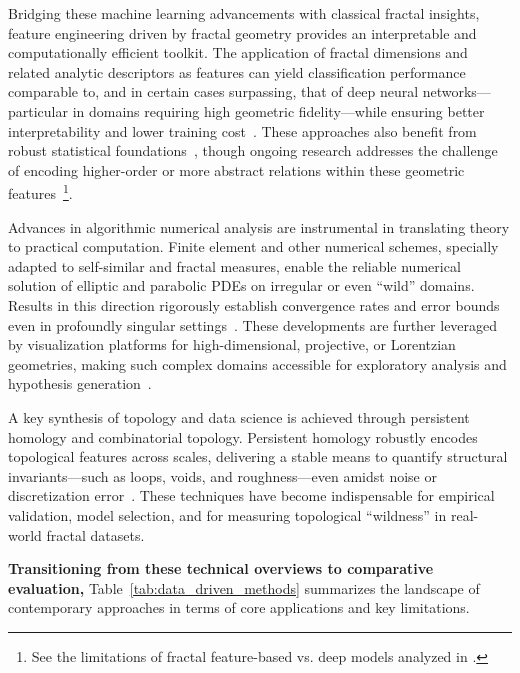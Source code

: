 \documentclass[sigconf]{acmart}
\begin{document}
Bridging these machine learning advancements with classical fractal insights, feature engineering driven by fractal geometry provides an interpretable and computationally efficient toolkit. The application of fractal dimensions and related analytic descriptors as features can yield classification performance comparable to, and in certain cases surpassing, that of deep neural networks—particular in domains requiring high geometric fidelity—while ensuring better interpretability and lower training cost~\cite{ref26,ref39}. These approaches also benefit from robust statistical foundations~\cite{ref30}, though ongoing research addresses the challenge of encoding higher-order or more abstract relations within these geometric features~\footnote{See the limitations of fractal feature-based vs. deep models analyzed in \cite{ref39}.}.

Advances in algorithmic numerical analysis are instrumental in translating theory to practical computation. Finite element and other numerical schemes, specially adapted to self-similar and fractal measures, enable the reliable numerical solution of elliptic and parabolic PDEs on irregular or even ``wild'' domains. Results in this direction rigorously establish convergence rates and error bounds even in profoundly singular settings~\cite{ref29,ref30,ref31,ref32,ref33,ref45}. These developments are further leveraged by visualization platforms for high-dimensional, projective, or Lorentzian geometries, making such complex domains accessible for exploratory analysis and hypothesis generation~\cite{ref29,ref45,ref54}.

A key synthesis of topology and data science is achieved through persistent homology and combinatorial topology. Persistent homology robustly encodes topological features across scales, delivering a stable means to quantify structural invariants—such as loops, voids, and roughness—even amidst noise or discretization error~\cite{ref39}. These techniques have become indispensable for empirical validation, model selection, and for measuring topological ``wildness'' in real-world fractal datasets.

\textbf{Transitioning from these technical overviews to comparative evaluation,} Table~\ref{tab:data_driven_methods} summarizes the landscape of contemporary approaches in terms of core applications and key limitations.
\end{document}
